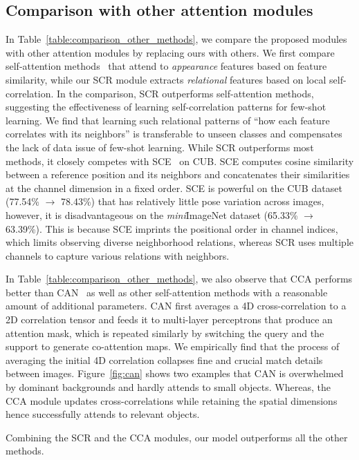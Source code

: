 \documentclass[10pt,twocolumn,letterpaper]{article}
\newcommand{\itmini}{\textit{mini}}
\newcommand{\abbself}{SCR\xspace}
\newcommand{\abbcross}{CCA\xspace}
\begin{document}
\subsection{Comparison with other attention modules}
In Table~\ref{table:comparison_other_methods}, we compare the proposed modules with other attention modules by replacing ours with others.
We first compare self-attention methods~\cite{nlsa, lsa, se} that attend to \textit{appearance} features based on feature similarity, while our \abbself module extracts \textit{relational} features based on local self-correlation.
In the comparison, \abbself outperforms self-attention methods, suggesting the effectiveness of learning self-correlation patterns for few-shot learning.
We find that learning such relational patterns of ``how each feature correlates with its neighbors'' is transferable to unseen classes and compensates the lack of data issue of few-shot learning.
While \abbself outperforms most methods, it closely competes with SCE~\cite{dccnet} on CUB.
SCE computes cosine similarity between a reference position and its neighbors and concatenates their similarities at the channel dimension in a fixed order.
SCE is powerful on the CUB dataset (77.54\% $\rightarrow$ 78.43\%) that has relatively little pose variation across images, however, it is disadvantageous on the \itmini ImageNet dataset (65.33\% $\rightarrow$ 63.39\%).
This is because SCE imprints the positional order in channel indices, which limits observing diverse neighborhood relations, whereas \abbself uses multiple channels to capture various relations with neighbors.

In Table~\ref{table:comparison_other_methods}, we also observe that \abbcross performs better than CAN~\cite{can} as well as other self-attention methods with a reasonable amount of additional parameters.
CAN first averages a 4D cross-correlation to a 2D correlation tensor and feeds it to multi-layer perceptrons that produce an attention mask, which is repeated similarly by switching the query and the support to generate co-attention maps.
We empirically find that the process of averaging the initial 4D correlation collapses fine and crucial match details between images.
Figure~\ref{fig:can} shows two examples that CAN is overwhelmed by dominant backgrounds and hardly attends to small objects.
Whereas, the \abbcross module updates cross-correlations while retaining the spatial dimensions hence successfully attends to relevant objects.

Combining the \abbself and the \abbcross modules, our model outperforms all the other methods. 
\end{document}
